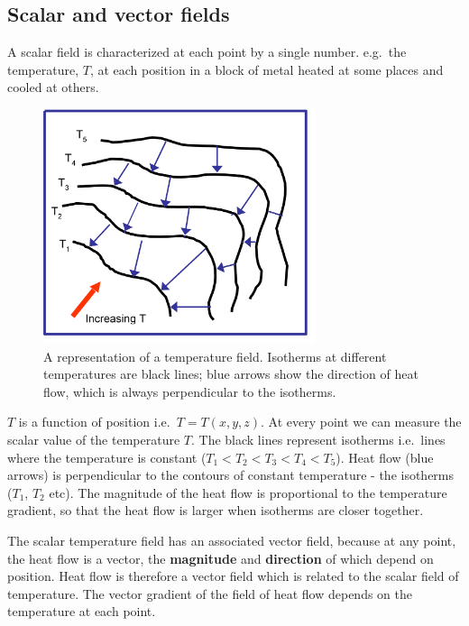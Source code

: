 \documentclass[
  letterpaper,
  DIV=11,
  numbers=noendperiod]{scrreprt}
\begin{document}
\subsection{Scalar and vector fields}\label{scalar-and-vector-fields}

A scalar field is characterized at each point by a single number.
e.g.~the temperature, \(T\), at each position in a block of metal heated
at some places and cooled at others.

\begin{figure}[H]

{\centering \includegraphics[width=80mm,height=\textheight]{Figures/isotherms.png}

}

\caption{A representation of a temperature field. Isotherms at different
temperatures are black lines; blue arrows show the direction of heat
flow, which is always perpendicular to the isotherms.}

\end{figure}%

\(T\) is a function of position i.e.~\(T = T(x,y,z)\). At every point we
can measure the scalar value of the temperature \(T\). The black lines
represent isotherms i.e.~lines where the temperature is constant
(\(T_1 < T_2 < T_3 < T_4 < T_5\)). Heat flow (blue arrows) is
perpendicular to the contours of constant temperature - the isotherms
(\(T_1\), \(T_2\) etc). The magnitude of the heat flow is proportional
to the temperature gradient, so that the heat flow is larger when
isotherms are closer together.

The scalar temperature field has an associated vector field, because at
any point, the heat flow is a vector, the \textbf{magnitude} and
\textbf{direction} of which depend on position. Heat flow is therefore a
vector field which is related to the scalar field of temperature. The
vector gradient of the field of heat flow depends on the temperature at
each point.
\end{document}

